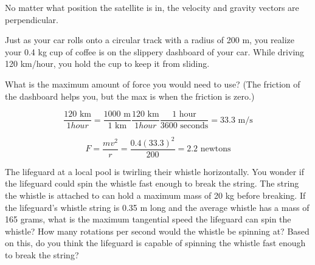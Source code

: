 No matter what position the satellite is in, the velocity and gravity vectors are perpendicular.


\begin{Exercise}[title={Circular Motion}, label=circular]
  Just as your car rolls onto a circular track with a radius of 200 m,
  you realize your 0.4 kg cup of coffee is on the slippery dashboard of your
  car. While driving 120 km/hour, you hold the cup to keep it from sliding.

  What is the maximum amount of force you would need to use? (The friction of
  the dashboard helps you, but the max is when the friction is zero.)

\end{Exercise}
\begin{Answer}[ref=circular]
  $$\frac{120 \text{ km}}{1 hour} = \frac{1000 \text{ m}}{1 \text{ km}}\frac{120 \text{ km}}{1 hour} \frac{1 \text{ hour}}{3600 \text{ seconds}}= 33.3 \text{ m/s}$$

  $$F = \frac{m v^2}{r} = \frac {0.4 (33.3)^2}{200} = 2.2 \text{ newtons}$$
\end{Answer}

\begin{Exercise}[title = {Twirling a Whistle}, label = whistle]
  The lifeguard at a local pool is twirling their whistle horizontally. You wonder if the lifeguard could spin the whistle fast enough to break the string. The string the whistle is attached to can hold a maximum mass of 20 kg before breaking. If the lifeguard's whistle string is 0.35 m long and the average whistle has a mass of 165 grams, what is the maximum tangential speed the lifeguard can spin the whistle? How many rotations per second would the whistle be spinning at? Based on this, do you think the lifeguard is capable of spinning the whistle fast enough to break the string?
\end{Exercise}

